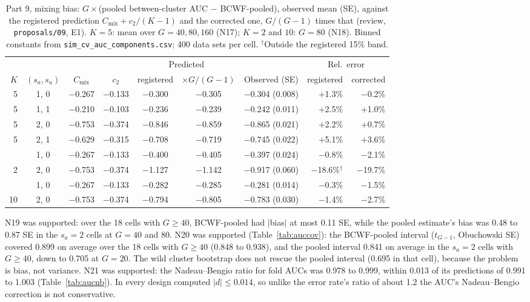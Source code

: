 \documentclass[11pt]{amsart}
\theoremstyle{plain}
\theoremstyle{definition}
\theoremstyle{remark}
\newcommand{\Cmix}{C_{\mathrm{mix}}}
\begin{document}
\begin{table}[tbp]
\centering\footnotesize
\caption{Part 9, mixing bias: $G\times$(pooled between-cluster AUC $-$ BCWF-pooled), observed mean (SE), against the registered prediction $\Cmix+c_2/(K-1)$ and the corrected one, $G/(G-1)$ times that (review, \texttt{proposals/09}, E1). $K=5$: mean over $G=40,80,160$ (N17); $K=2$ and $10$: $G=80$ (N18). Binned constants from \texttt{sim\_cv\_auc\_components.csv}; 400 data sets per cell. $^{\dagger}$Outside the registered 15\% band.}\label{tab:aucmix}
\begin{tabular}{@{}r c c c c c c r r@{}}
\toprule
 & & & & \multicolumn{2}{c}{Predicted} & & \multicolumn{2}{c}{Rel.\ error}\\
\cmidrule(lr){5-6}\cmidrule(l){8-9}
$K$ & $(s_a,s_u)$ & $\Cmix$ & $c_2$ & registered & $\times G/(G-1)$ & Observed (SE) & registered & corrected\\
\midrule
5 & 1, 0 & $-$0.267 & $-$0.133 & $-$0.300 & $-$0.305 & $-$0.304 (0.008) & $+$1.3\% & $-$0.2\% \\
5 & 1, 1 & $-$0.210 & $-$0.103 & $-$0.236 & $-$0.239 & $-$0.242 (0.011) & $+$2.5\% & $+$1.0\% \\
5 & 2, 0 & $-$0.753 & $-$0.374 & $-$0.846 & $-$0.859 & $-$0.865 (0.021) & $+$2.2\% & $+$0.7\% \\
5 & 2, 1 & $-$0.629 & $-$0.315 & $-$0.708 & $-$0.719 & $-$0.745 (0.022) & $+$5.1\% & $+$3.6\% \\
\addlinespace
2 & 1, 0 & $-$0.267 & $-$0.133 & $-$0.400 & $-$0.405 & $-$0.397 (0.024) & $-$0.8\% & $-$2.1\% \\
2 & 2, 0 & $-$0.753 & $-$0.374 & $-$1.127 & $-$1.142 & $-$0.917 (0.060) & $-$18.6\%$^{\dagger}$ & $-$19.7\% \\
\addlinespace
10 & 1, 0 & $-$0.267 & $-$0.133 & $-$0.282 & $-$0.285 & $-$0.281 (0.014) & $-$0.3\% & $-$1.5\% \\
10 & 2, 0 & $-$0.753 & $-$0.374 & $-$0.794 & $-$0.805 & $-$0.783 (0.030) & $-$1.4\% & $-$2.7\% \\
\bottomrule
\end{tabular}
\end{table}

N19 was supported: over the 18 cells with $G\ge40$, BCWF-pooled had $|$bias$|$ at most 0.11 SE, while the pooled estimate's bias was 0.48 to 0.87 SE in the $s_a=2$ cells at $G=40$ and $80$. N20 was supported (Table~\ref{tab:auccov}): the BCWF-pooled interval ($t_{G-1}$, Obuchowski SE) covered 0.899 on average over the 18 cells with $G\ge40$ (0.848 to 0.938), and the pooled interval 0.841 on average in the $s_a=2$ cells with $G\ge40$, down to 0.705 at $G=20$. The wild cluster bootstrap does not rescue the pooled interval (0.695 in that cell), because the problem is bias, not variance. N21 was supported: the Nadeau--Bengio ratio for fold AUCs was 0.978 to 0.999, within 0.013 of its predictions of 0.991 to 1.003 (Table~\ref{tab:aucnb}). In every design computed $|d|\le0.014$, so unlike the error rate's ratio of about 1.2 the AUC's Nadeau--Bengio correction is not conservative.
\end{document}
